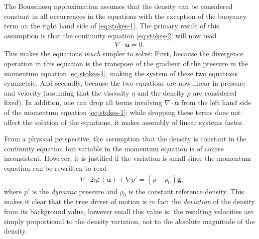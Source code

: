 \documentclass{article}
\begin{document}
The Boussinesq approximation assumes that the density can be
considered constant in all occurrences in the equations with the exception of
the buoyancy term on the right hand side of \eqref{eq:stokes-1}. The primary
result of this assumption is that the continuity equation \eqref{eq:stokes-2}
will now read
\begin{gather*}
  \nabla \cdot \mathbf u = 0.
\end{gather*}
This makes the equations \textit{much} simpler to solve: First, because the
divergence operation in this equation is the transpose of the gradient of the
pressure in the momentum equation \eqref{eq:stokes-1}, making the system of
these two equations symmetric. And secondly, because the two equations are now
linear in pressure and velocity (assuming that the viscosity $\eta$ and the
density $\rho$ are considered fixed). In addition, one can drop all terms
involving $\nabla \cdot \mathbf u$ from the left hand side of the momentum
equation \eqref{eq:stokes-1}; while dropping these terms does not
affect the solution of the equations, it makes assembly of linear systems
faster.

From a physical perspective, the assumption that the density is constant in
the continuity equation but variable in the momentum equation is of course
inconsistent. However, it is justified if the variation is small since the
momentum equation can be rewritten to read
\begin{gather*}
  -\nabla \cdot 2\eta \varepsilon(\mathbf u) + \nabla p' =
  (\rho-\rho_0) \mathbf g,
\end{gather*}
where $p'$ is the \textit{dynamic} pressure and $\rho_0$ is the constant
reference density. This makes it clear that the true driver of motion is in
fact the \textit{deviation} of the density from its background value, however
small this value is: the resulting velocities are simply proportional to the
density variation, not to the absolute magnitude of the density.
\end{document}
